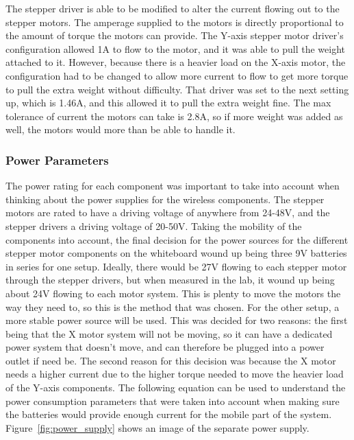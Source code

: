 The stepper driver is able to be modified to alter the current flowing out to the stepper motors. The amperage supplied to the motors is directly proportional to the amount of torque the motors can provide. The Y-axis stepper motor driver's configuration allowed 1A to flow to the motor, and it was able to pull the weight attached to it. However, because there is a heavier load on the X-axis motor, the configuration had to be changed to allow more current to flow to get more torque to pull the extra weight without difficulty. That driver was set to the next setting up, which is 1.46A, and this allowed it to pull the extra weight fine. The max tolerance of current the motors can take is 2.8A, so if more weight was added as well, the motors would more than be able to handle it.

\subsubsection{Power Parameters}

The power rating for each component was important to take into account when thinking about the power supplies for the wireless components. The stepper motors are rated to have a driving voltage of anywhere from 24-48V, and the stepper drivers a driving voltage of 20-50V. Taking the mobility of the components into account, the final decision for the power sources for the different stepper motor components on the whiteboard wound up being three 9V batteries in series for one setup. Ideally, there would be 27V flowing to each stepper motor through the stepper drivers, but when measured in the lab, it wound up being about 24V flowing to each motor system. This is plenty to move the motors the way they need to, so this is the method that was chosen. For the other setup, a more stable power source will be used. This was decided for two reasons: the first being that the X motor system will not be moving, so it can have a dedicated power system that doesn't move, and can therefore be plugged into a power outlet if need be. The second reason for this decision was because the X motor needs a higher current due to the higher torque needed to move the heavier load of the Y-axis components. The following equation can be used to understand the power consumption parameters that were taken into account when making sure the batteries would provide enough current for the mobile part of the system. Figure~\ref{fig:power_supply} shows an image of the separate power supply.\\

